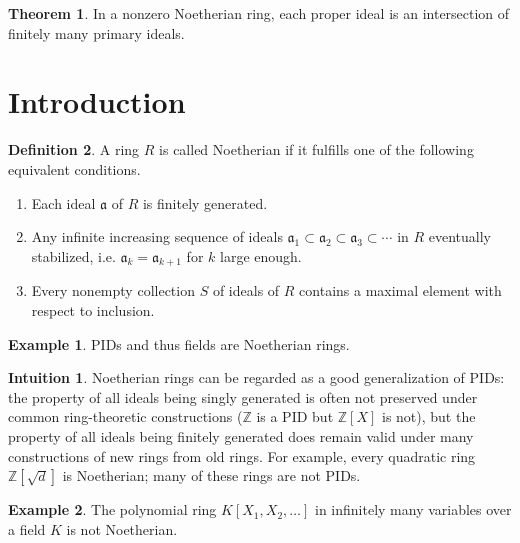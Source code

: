 \documentclass[a4paper]{book}
\theoremstyle{definition}
\newtheorem{definition}{Definition}[]
\newtheorem{example}{Example}[definition]
\newtheorem{theorem}[definition]{Theorem}
\newtheorem*{intuition}{Intuition}
\begin{document}
\begin{thmbox}
    \begin{theorem}
        In a nonzero Noetherian ring, each proper ideal is an intersection of finitely many primary ideals.
    \end{theorem}
\end{thmbox}


\newpage
\section{Introduction}
\begin{defbox}
    \begin{definition}
        A ring \(R\) is called Noetherian if it fulfills one of the following equivalent conditions.
        \begin{enumerate}
            \item Each ideal \(\mathfrak{a}\) of \(R\) is finitely generated.
            \item Any infinite increasing sequence of ideals \(\mathfrak{a}_1 \subset \mathfrak{a}_2 \subset \mathfrak{a}_3 \subset \cdots\) in \(R\) eventually stabilized, i.e. \(\mathfrak{a}_k = \mathfrak{a}_{k + 1}\) for \(k\) large enough.
            \item Every nonempty collection \(S\) of ideals of \(R\) contains a maximal element with respect to inclusion.
        \end{enumerate}
    \end{definition}
\end{defbox}
\begin{exmbox}
    \begin{example}
        PIDs and thus fields are Noetherian rings.
    \end{example}
\end{exmbox}
\begin{rembox}
    \begin{intuition}
        Noetherian rings can be regarded as a good generalization of PIDs: the property of all ideals being singly generated is often not preserved under common ring-theoretic constructions (\(\mathbb{Z}\) is a PID but \(\mathbb{Z}[X]\) is not), but the property of all ideals being finitely generated does remain valid under many constructions of new rings from old rings. For example, every quadratic ring \(\mathbb{Z}[\sqrt{d}]\) is Noetherian; many of these rings are not PIDs.
    \end{intuition}
\end{rembox}
\begin{exmbox}
    \begin{example}
        The polynomial ring \(K[X_1, X_2, \ldots]\) in infinitely many variables over a field \(K\) is not Noetherian.
    \end{example}
\end{exmbox}
\end{document}

